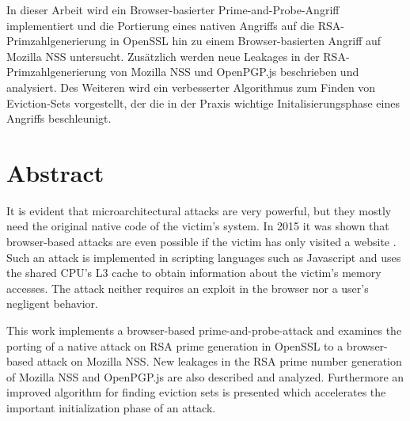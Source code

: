 In dieser Arbeit wird ein Browser-basierter Prime-and-Probe-Angriff implementiert und die Portierung eines nativen Angriffs auf die RSA-Primzahlgenerierung \cite{RSAKeyGeneration2} in OpenSSL hin zu einem Browser-basierten Angriff auf Mozilla NSS untersucht.
Zusätzlich werden neue Leakages in der RSA-Primzahlgenerierung von Mozilla NSS und OpenPGP.js beschrieben und analysiert.
Des Weiteren wird ein verbesserter Algorithmus zum Finden von Eviction-Sets vorgestellt, der die in der Praxis wichtige Initalisierungsphase eines Angriffs beschleunigt. 


{\let\cleardoublepage\relax \chapter*{Abstract}}

It is evident that microarchitectural attacks are very powerful, but they mostly need the original native code of the victim's system. 
In 2015 it was shown that browser-based attacks are even possible if the victim has only visited a website \cite{TheSpyInTheSandbox}. Such an attack is implemented in scripting languages such as Javascript and uses the shared CPU's L3 cache to obtain information about the victim's memory accesses.
The attack neither requires an exploit in the browser nor a user's negligent behavior.%

This work implements a browser-based prime-and-probe-attack and examines the porting of a native attack on RSA prime generation \cite{RSAKeyGeneration2} in OpenSSL to a browser-based attack on Mozilla NSS.
New leakages in the RSA prime number generation of Mozilla NSS and OpenPGP.js are also described and analyzed.
Furthermore an improved algorithm for finding eviction sets is presented which accelerates the important initialization phase of an attack.